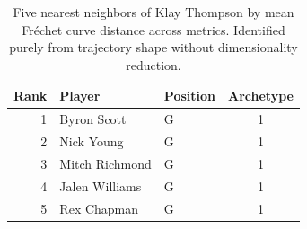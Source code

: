 \begin{table}[htbp]
  \centering\small
  \begin{tabular}{rllc}
    \toprule
    Rank & Player & Position & Archetype \\
    \midrule
    1 & Byron Scott & G & 1 \\
    2 & Nick Young & G & 1 \\
    3 & Mitch Richmond & G & 1 \\
    4 & Jalen Williams & G & 1 \\
    5 & Rex Chapman & G & 1 \\
    \bottomrule
  \end{tabular}
  \caption{Five nearest neighbors of Klay Thompson by mean Fr\'{e}chet curve distance across metrics. Identified purely from trajectory shape without dimensionality reduction.}
  \label{tab:Klay_Thompson_frechet_curve_neighbors}
\end{table}

